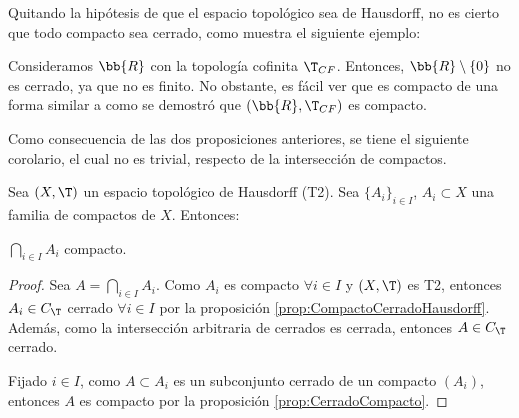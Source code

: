 Quitando la hipótesis de que el espacio topológico sea de Hausdorff, no es cierto que todo compacto sea cerrado, como muestra
el siguiente ejemplo:
\begin{ejemplo}
    Consideramos $\bb{R}$ con la topología cofinita $\T_{CF}$.
    Entonces, $\bb{R}\setminus \{0\}$ no es cerrado, ya que no es finito. No obstante, es fácil ver que es
    compacto de una forma similar a como se demostró que $(\bb{R},\T_{CF})$ es compacto.
\end{ejemplo}

Como consecuencia de las dos proposiciones anteriores, se tiene el siguiente corolario, el cual no es trivial, respecto de la intersección de compactos.
\begin{coro} \label{coro:InterseccionCompactos}
    Sea $(X,\T)$ un espacio topológico de Hausdorff (T2). Sea $\{A_i\}_{i\in I}$, $A_i\subset X$ una familia de compactos de $X$.
    Entonces:
    \begin{center}
        $\bigcap\limits_{i\in I}A_i$ compacto.
    \end{center}
\end{coro}
\begin{proof}
    Sea $A=\bigcap\limits_{i\in I}A_i$. Como $A_i$ es compacto $\forall i\in I$ y $(X,\T)$ es T2, entonces $A_i\in C_\T$ cerrado $\forall i\in I$ por la proposición \ref{prop:CompactoCerradoHausdorff}.
    Además, como la intersección arbitraria de cerrados es cerrada, entonces $A\in C_\T$ cerrado.

    Fijado $i\in I$, como $A\subset A_i$ es un subconjunto cerrado de un compacto $(A_i)$, entonces $A$ es compacto por la proposición \ref{prop:CerradoCompacto}.
\end{proof}


